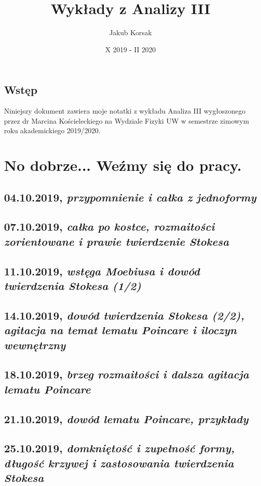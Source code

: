 \documentclass[b5paper]{memoir}
\title{\Huge \textbf{Wykłady z Analizy III}}
\author{Jakub Korsak}
\date{X 2019 - II 2020}
\let\LaTeXStandardTableOfContents\tableofcontents
\renewcommand{\tableofcontents}{%
\begingroup%
\renewcommand{\bfseries}{\relax}%
\LaTeXStandardTableOfContents%
\endgroup%
}%
\begin{document}
\frontmatter
\maketitle
\pagebreak
\tableofcontents

\chapter{Wstęp}
Niniejszy dokument zawiera moje notatki z wykładu Analiza III wygłoszonego przez dr Marcina Kościeleckiego na Wydziale Fizyki UW w semestrze zimowym roku akademickiego 2019/2020.

\mainmatter
\part{No dobrze... Weźmy się do pracy.}
\chapter{04.10.2019, \textit{przypomnienie i całka z jednoformy}}

\chapter{07.10.2019, \textit{całka po kostce, rozmaitości zorientowane i prawie twierdzenie Stokesa}}

\chapter{11.10.2019, \textit{wstęga Moebiusa i dowód twierdzenia Stokesa (1/2)}}

\chapter{14.10.2019, \textit{dowód twierdzenia Stokesa (2/2), agitacja na temat lematu Poincare i iloczyn wewnętrzny}}

\chapter{18.10.2019, \textit{brzeg rozmaitości i dalsza agitacja lematu Poincare}}

\chapter{21.10.2019, \textit{dowód lematu Poincare, przykłady}}

\chapter{25.10.2019, \textit{domkniętość i zupełność formy, długość krzywej i zastosowania twierdzenia Stokesa}}

\end{document}
